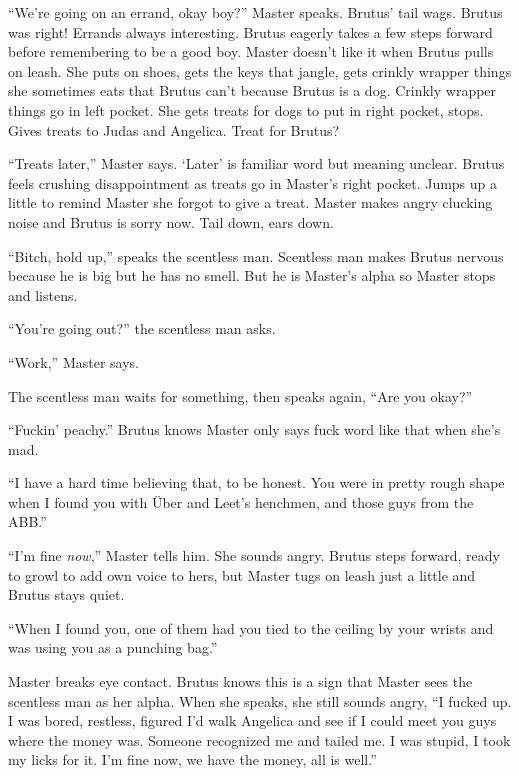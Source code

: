 ``We're going on an errand, okay boy?'' Master speaks.  Brutus' tail wags.  Brutus was right!  Errands always interesting.  Brutus eagerly takes a few steps forward before remembering to be a good boy.  Master doesn't like it when Brutus pulls on leash.  She puts on shoes, gets the keys that jangle, gets crinkly wrapper things she sometimes eats that Brutus can't because Brutus is a dog.  Crinkly wrapper things go in left pocket.  She gets treats for dogs to put in right pocket, stops.  Gives treats to Judas and Angelica.  Treat for Brutus?



``Treats later,'' Master says.  `Later' is familiar word but meaning unclear.  Brutus feels crushing disappointment as treats go in Master's right pocket.  Jumps up a little to remind Master she forgot to give a treat.  Master makes angry clucking noise and Brutus is sorry now.  Tail down, ears down.



``Bitch, hold up,'' speaks the scentless man.  Scentless man makes Brutus nervous because he is big but he has no smell.  But he is Master's alpha so Master stops and listens.



``You're going out?'' the scentless man asks.



``Work,'' Master says.



The scentless man waits for something, then speaks again, ``Are you okay?''



``Fuckin' peachy.''  Brutus knows Master only says fuck word like that when she's mad.



``I have a hard time believing that, to be honest.  You were in pretty rough shape when I found you with \"{U}ber and Leet's henchmen, and those guys from the ABB.''



``I'm fine \emph{now},'' Master tells him.  She sounds angry.  Brutus steps forward, ready to growl to add own voice to hers, but Master tugs on leash just a little and Brutus stays quiet.



``When I found you, one of them had you tied to the ceiling by your wrists and was using you as a punching bag.''



Master breaks eye contact.  Brutus knows this is a sign that Master sees the scentless man as her alpha.  When she speaks, she still sounds angry, ``I fucked up.  I was bored, restless, figured I'd walk Angelica and see if I could meet you guys where the money was.  Someone recognized me and tailed me.  I was stupid, I took my licks for it.  I'm fine now, we have the money, all is well.''



